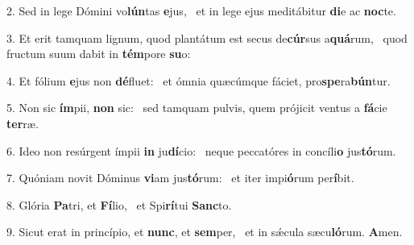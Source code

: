 2. Sed in lege Dómini vo\textbf{lún}tas \textbf{e}jus, \ast\  et in lege ejus meditábitur \textbf{di}e ac \textbf{noc}te.\

3. Et erit tamquam lignum, quod plantátum est secus de\textbf{cúr}sus a\textbf{quá}rum, \ast\  quod fructum suum dabit in \textbf{tém}pore \textbf{su}o:\

4. Et fólium \textbf{e}jus non \textbf{dé}fluet: \ast\  et ómnia quæcúmque fáciet, pro\textbf{spe}ra\textbf{bún}tur.\

5. Non sic \textbf{ím}pii, \textbf{non} sic: \ast\  sed tamquam pulvis, quem prójicit ventus a \textbf{fá}cie \textbf{ter}ræ.\

6. Ideo non resúrgent ímpii \textbf{in} ju\textbf{dí}cio: \ast\  neque peccatóres in concíli\textbf{o} jus\textbf{tó}rum.\

7. Quóniam novit Dóminus \textbf{vi}am jus\textbf{tó}rum: \ast\  et iter impi\textbf{ó}rum per\textbf{í}bit.\

8. Glória \textbf{Pa}tri, et \textbf{Fí}lio, \ast\  et Spi\textbf{rí}tui \textbf{Sanc}to.\

9. Sicut erat in princípio, et \textbf{nunc}, et \textbf{sem}per, \ast\  et in sǽcula sæcu\textbf{ló}rum. \textbf{A}men.\

